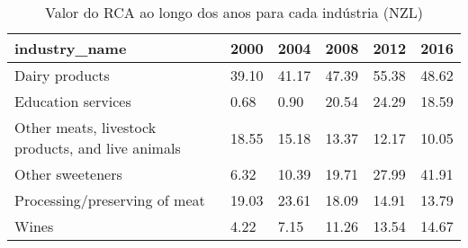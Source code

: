 \begin{table}
\centering
\caption{Valor do RCA ao longo dos anos para cada indústria (NZL)}
\begin{tabular}{p{6cm}p{1.5cm}p{1.5cm}p{1.5cm}p{1.5cm}p{1.5cm}}
\toprule
                                    industry\_name &  2000 &  2004 &  2008 &  2012 &  2016 \\
\midrule
                                   Dairy products & 39.10 & 41.17 & 47.39 & 55.38 & 48.62 \\
                               Education services &  0.68 &  0.90 & 20.54 & 24.29 & 18.59 \\
Other meats, livestock products, and live animals & 18.55 & 15.18 & 13.37 & 12.17 & 10.05 \\
                                 Other sweeteners &  6.32 & 10.39 & 19.71 & 27.99 & 41.91 \\
                    Processing/preserving of meat & 19.03 & 23.61 & 18.09 & 14.91 & 13.79 \\
                                            Wines &  4.22 &  7.15 & 11.26 & 13.54 & 14.67 \\
\bottomrule
\end{tabular}
\end{table}
